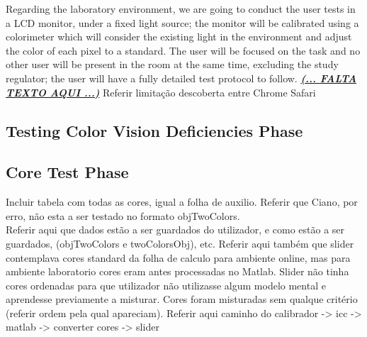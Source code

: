 %
Regarding the laboratory environment, we are going to conduct the user tests in a LCD monitor, under a fixed light source; the monitor will be calibrated
using a colorimeter which will consider the existing light in the environment and adjust the color of each pixel to a standard. The user will be focused on
the task and no other user will be present in the room at the same time, excluding the study regulator; the user will have a fully detailed test protocol to
follow.
%
\textbf{\underline{\emph{(... FALTA TEXTO AQUI ...)}}}
%
Referir limitação descoberta entre Chrome Safari
%
\subsection{Testing Color Vision Deficiencies Phase}
\label{subsec:design_ishihara}
%
\subsection{Core Test Phase}
\label{subsec:design_core}
%
Incluir tabela com todas as cores, igual a folha de auxilio. Referir que Ciano, por erro, não esta a ser testado no formato objTwoColors. \\
Referir aqui que dados estão a ser guardados do utilizador, e como estão a ser guardados, (objTwoColors e twoColorsObj), etc.
Referir aqui também que slider contemplava cores standard da folha de calculo para ambiente online,
mas para ambiente laboratorio cores eram antes processadas no Matlab. Slider não tinha cores ordenadas para que utilizador não utilizasse
algum modelo mental e aprendesse previamente a misturar. Cores foram misturadas sem qualque critério (referir ordem pela qual apareciam).
Referir aqui caminho do calibrador -> icc -> matlab -> converter cores -> slider



